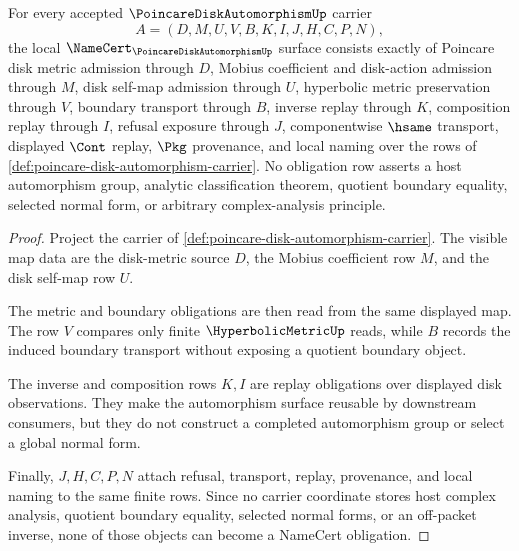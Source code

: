 \begin{theorem}
\label{thm:poincare-disk-automorphism-namecert-obligations}
For every accepted $\PoincareDiskAutomorphismUp$ carrier
$$
A=(D,M,U,V,B,K,I,J,H,C,P,N),
$$
the local $\NameCert_{\PoincareDiskAutomorphismUp}$ surface consists exactly of
Poincare disk metric admission through $D$, Mobius coefficient and disk-action
admission through $M$, disk self-map admission through $U$, hyperbolic metric
preservation through $V$, boundary transport through $B$, inverse replay
through $K$, composition replay through $I$, refusal exposure through $J$,
componentwise $\hsame$ transport, displayed $\Cont$ replay, $\Pkg$ provenance,
and local naming over the rows of
\autoref{def:poincare-disk-automorphism-carrier}. No obligation row asserts a
host automorphism group, analytic classification theorem, quotient boundary
equality, selected normal form, or arbitrary complex-analysis principle.
\end{theorem}
\begin{proof}
Project the carrier of
\autoref{def:poincare-disk-automorphism-carrier}. The visible map data are the
disk-metric source $D$, the Mobius coefficient row $M$, and the disk self-map
row $U$.

The metric and boundary obligations are then read from the same displayed map.
The row $V$ compares only finite $\HyperbolicMetricUp$ reads, while $B$ records
the induced boundary transport without exposing a quotient boundary object.

The inverse and composition rows $K,I$ are replay obligations over displayed
disk observations. They make the automorphism surface reusable by downstream
consumers, but they do not construct a completed automorphism group or select
a global normal form.

Finally, $J,H,C,P,N$ attach refusal, transport, replay, provenance, and local
naming to the same finite rows. Since no carrier coordinate stores host
complex analysis, quotient boundary equality, selected normal forms, or an
off-packet inverse, none of those objects can become a NameCert obligation.
\end{proof}

